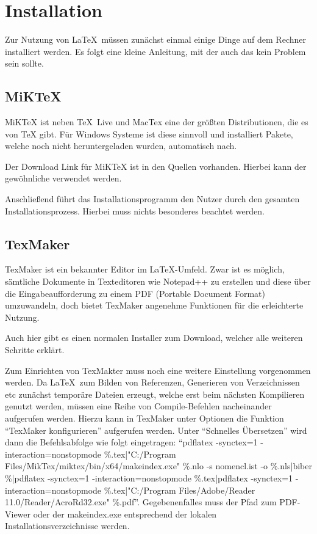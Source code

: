 
\chapter{Installation}\label{ch:installation}

Zur Nutzung von \LaTeX\ müssen zunächst einmal einige Dinge auf dem Rechner installiert werden. 
Es folgt eine kleine Anleitung, mit der auch das kein Problem sein sollte.

\section{MiKTeX}
MiKTeX ist neben \TeX\ Live und MacTex eine der größten Distributionen, die es von TeX gibt. 
Für Windows Systeme ist diese sinnvoll und installiert Pakete, welche noch nicht heruntergeladen wurden, automatisch nach.

Der Download Link für MiKTeX ist in den Quellen vorhanden.\autocite[Vgl.][]{miktex} Hierbei kann der gewöhnliche  verwendet werden. 

Anschließend führt das Installationsprogramm den Nutzer durch den gesamten Installationsprozess. Hierbei muss nichts besonderes beachtet werden.

\section{TexMaker}
TexMaker ist ein bekannter Editor im \LaTeX-Umfeld. 
Zwar ist es möglich, sämtliche Dokumente in Texteditoren wie Notepad++ zu erstellen und diese über die Eingabeaufforderung zu einem PDF (Portable Document Format) umzuwandeln, doch bietet TexMaker angenehme Funktionen für die erleichterte Nutzung.

Auch hier gibt es einen normalen Installer zum Download, welcher alle weiteren Schritte erklärt.\autocite[Vgl.][]{texmaker}

Zum Einrichten von TexMakter muss noch eine weitere Einstellung vorgenommen werden. 
Da \LaTeX\ zum Bilden von Referenzen, Generieren von Verzeichnissen etc zunächst temporäre Dateien erzeugt, welche erst beim nächsten Kompilieren genutzt werden, müssen eine Reihe von Compile-Befehlen nacheinander aufgerufen werden. 
Hierzu kann in TexMaker unter Optionen die Funktion \enquote{TexMaker konfigurieren} aufgerufen werden. 
Unter \enquote{Schnelles Übersetzen} wird dann die Befehlsabfolge wie folgt eingetragen: \enquote{pdflatex -synctex=1 -interaction=nonstopmode \%.tex|"C:/Program Files/MikTex/miktex/bin/x64/makeindex.exe" \%.nlo -s nomencl.ist -o \%.nls|biber \%|pdflatex -synctex=1 -interaction=nonstopmode \%.tex|pdflatex -synctex=1 -interaction=nonstopmode \%.tex|"C:/Program Files/Adobe/Reader 11.0/Reader/AcroRd32.exe" \%.pdf}. 
Gegebenenfalles muss der Pfad zum PDF-Viewer oder der makeindex.exe entsprechend der lokalen Installationsverzeichnisse werden.


